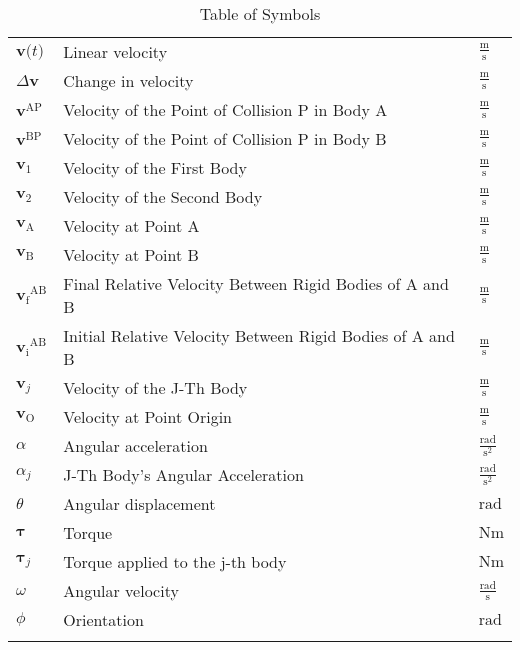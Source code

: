 \documentclass[12pt]{article}
\begin{document}
\begin{longtabu}{l X[l] l}
\\
$\symbf{v}\text{(}t\text{)}$ & Linear velocity & $\frac{\text{m}}{\text{s}}$
\\
$Δ\symbf{v}$ & Change in velocity & $\frac{\text{m}}{\text{s}}$
\\
${\symbf{v}^{\text{A}\text{P}}}$ & Velocity of the Point of Collision P in Body A & $\frac{\text{m}}{\text{s}}$
\\
${\symbf{v}^{\text{B}\text{P}}}$ & Velocity of the Point of Collision P in Body B & $\frac{\text{m}}{\text{s}}$
\\
${\symbf{v}_{1}}$ & Velocity of the First Body & $\frac{\text{m}}{\text{s}}$
\\
${\symbf{v}_{2}}$ & Velocity of the Second Body & $\frac{\text{m}}{\text{s}}$
\\
${\symbf{v}_{\text{A}}}$ & Velocity at Point A & $\frac{\text{m}}{\text{s}}$
\\
${\symbf{v}_{\text{B}}}$ & Velocity at Point B & $\frac{\text{m}}{\text{s}}$
\\
${{\symbf{v}_{\text{f}}}^{\text{A}\text{B}}}$ & Final Relative Velocity Between Rigid Bodies of A and B & $\frac{\text{m}}{\text{s}}$
\\
${{\symbf{v}_{\text{i}}}^{\text{A}\text{B}}}$ & Initial Relative Velocity Between Rigid Bodies of A and B & $\frac{\text{m}}{\text{s}}$
\\
${\symbf{v}_{j}}$ & Velocity of the J-Th Body & $\frac{\text{m}}{\text{s}}$
\\
${\symbf{v}_{\text{O}}}$ & Velocity at Point Origin & $\frac{\text{m}}{\text{s}}$
\\
$α$ & Angular acceleration & $\frac{\text{rad}}{\text{s}^{2}}$
\\
${α_{j}}$ & J-Th Body's Angular Acceleration & $\frac{\text{rad}}{\text{s}^{2}}$
\\
$θ$ & Angular displacement & ${\text{rad}}$
\\
$\symbf{τ}$ & Torque & $\text{N}\text{m}$
\\
${\symbf{τ}_{j}}$ & Torque applied to the j-th body & $\text{N}\text{m}$
\\
$ω$ & Angular velocity & $\frac{\text{rad}}{\text{s}}$
\\
$ϕ$ & Orientation & ${\text{rad}}$
\\
\bottomrule
\caption{Table of Symbols}
\label{Table:ToS}
\end{longtabu}
\end{document}
